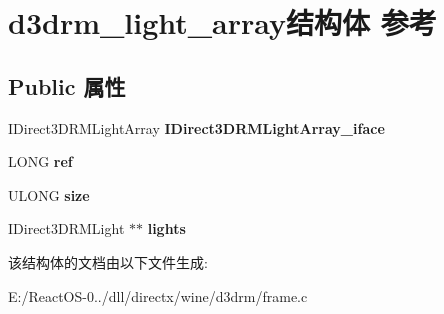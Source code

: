 \hypertarget{structd3drm__light__array}{}\section{d3drm\+\_\+light\+\_\+array结构体 参考}
\label{structd3drm__light__array}
\subsection*{Public 属性}
\begin{DoxyCompactItemize}
\item 
\mbox{\label{structd3drm__light__array_aeb4500c7dd1eef61ec2bfc62693850b9}} 
I\+Direct3\+D\+R\+M\+Light\+Array {\bfseries I\+Direct3\+D\+R\+M\+Light\+Array\+\_\+iface}
\item 
\mbox{\label{structd3drm__light__array_a25e9da3d8c6031d0fe5552d137c07c14}} 
L\+O\+NG {\bfseries ref}
\item 
\mbox{\label{structd3drm__light__array_a65d4aa82d734707e1c2cd4443a4685f3}} 
U\+L\+O\+NG {\bfseries size}
\item 
\mbox{\label{structd3drm__light__array_a5c4b599f858eed9b909d40aa9b5dc157}} 
I\+Direct3\+D\+R\+M\+Light $\ast$$\ast$ {\bfseries lights}
\end{DoxyCompactItemize}


该结构体的文档由以下文件生成\+:\begin{DoxyCompactItemize}
\item 
E\+:/\+React\+O\+S-\/0../dll/directx/wine/d3drm/frame.\+c\end{DoxyCompactItemize}
